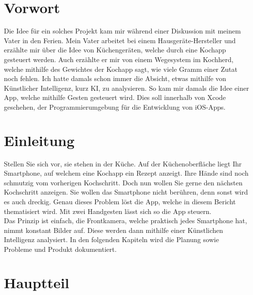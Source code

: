 \documentclass[12pt]{article}
\begin{document}
\section{Vorwort}
Die Idee für ein solches Projekt kam mir während einer Diskussion mit meinem Vater in den Ferien. Mein Vater arbeitet bei einem Hausgeräte-Hersteller und erzählte mir über die Idee von Küchengeräten, welche durch eine Kochapp gesteuert werden. Auch erzählte er mir von einem Wegesystem im Kochherd, welche mithilfe des Gewichtes der Kochapp sagt, wie viele Gramm einer Zutat noch fehlen. Ich hatte damals schon immer die Absicht, etwas mithilfe von Künstlicher Intelligenz, kurz KI, zu analysieren. So kam mir damals die Idee einer App, welche mithilfe Gesten gesteuert wird. Dies soll innerhalb von Xcode geschehen, der Programmierumgebung für die Entwicklung von iOS-Apps.

\section{Einleitung}
Stellen Sie sich vor, sie stehen in der Küche. Auf der Küchenoberfläche liegt Ihr Smartphone, auf welchem eine Kochapp ein Rezept anzeigt. Ihre Hände sind noch schmutzig vom vorherigen Kochschritt. Doch nun wollen Sie gerne den nächsten Kochschritt anzeigen. Sie wollen das Smartphone nicht berühren, denn sonst wird es auch dreckig. Genau dieses Problem löst die App, welche in diesem Bericht thematisiert wird. Mit zwei Handgesten lässt sich so die App steuern.\\ Das Prinzip ist einfach, die Frontkamera, welche praktisch jedes Smartphone hat, nimmt konstant Bilder auf. Diese werden dann mithilfe einer Künstlichen Intelligenz analysiert. In den folgenden Kapiteln wird die Planung sowie Probleme und Produkt dokumentiert. 


\section{Hauptteil}
\end{document}
